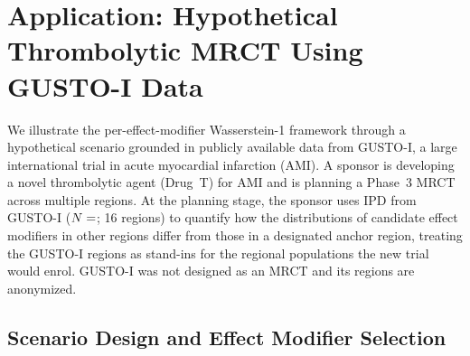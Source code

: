 \documentclass[AMA,Times1COL]{WileyNJDv5}
\begin{document}


\section{Application: Hypothetical Thrombolytic MRCT Using GUSTO-I Data}\label{sec:application}

We illustrate the per-effect-modifier Wasserstein-1 framework through a hypothetical scenario grounded in publicly available data from GUSTO-I, a large international trial in acute myocardial infarction (AMI). A sponsor is developing a novel thrombolytic agent (Drug~T) for AMI and is planning a Phase~3 MRCT across multiple regions. At the planning stage, the sponsor uses IPD from GUSTO-I ($N = \numval{gustoN}$; 16 regions)\cite{gusto1993} to quantify how the distributions of candidate effect modifiers in other regions differ from those in a designated anchor region, treating the GUSTO-I regions as stand-ins for the regional populations the new trial would enrol. GUSTO-I was not designed as an MRCT and its regions are anonymized.

\subsection{Scenario Design and Effect Modifier Selection}\label{sec:app_scenario}
\end{document}
